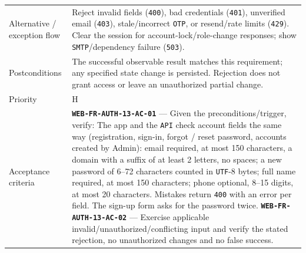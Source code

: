 \begin{longtable}{@{}P{0.23000\SRSWidth}P{0.77000\SRSWidth}@{}}
Alternative /\allowbreak{} exception flow & Reject invalid fields (\texttt{400}), bad credentials (\texttt{401}), unverified email (\texttt{403}), stale/\allowbreak{}incorrect \texttt{OTP}, or resend/\allowbreak{}rate limits (\texttt{429}). Clear the session for account-lock/\allowbreak{}role-change responses; show \texttt{SMTP}/\allowbreak{}dependency failure (\texttt{503}). \\[3pt]
Postconditions & The successful observable result matches this requirement; any specified state change is persisted. Rejection does not grant access or leave an unauthorized partial change. \\[3pt]
Priority & H \\[3pt]
Acceptance criteria & \textbf{\texttt{WEB-\allowbreak{}FR-\allowbreak{}AUTH-\allowbreak{}13-\allowbreak{}AC-\allowbreak{}01}} — Given the preconditions/\allowbreak{}trigger, verify: The app and the \texttt{API} check account fields the same way (registration, sign-in, forgot /\allowbreak{} reset password, accounts created by Admin): email required, at most 150 characters, a domain with a suffix of at least 2 letters, no spaces; a new password of 6–72 characters counted in \texttt{UTF}-8 bytes; full name required, at most 150 characters; phone optional, 8–15 digits, at most 20 characters. Mistakes return \texttt{400} with an error per field. The sign-up form asks for the password twice. \textbf{\texttt{WEB-\allowbreak{}FR-\allowbreak{}AUTH-\allowbreak{}13-\allowbreak{}AC-\allowbreak{}02}} — Exercise applicable invalid/\allowbreak{}unauthorized/\allowbreak{}conflicting input and verify the stated rejection, no unauthorized changes and no false success. \\[3pt]

\end{longtable}
